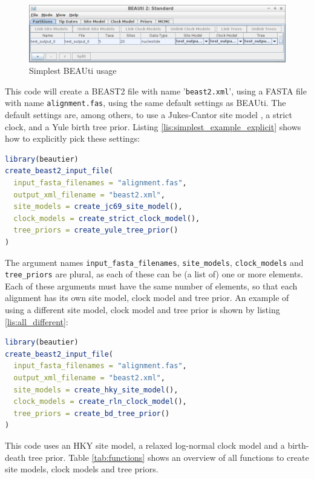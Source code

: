 \documentclass{article}
\begin{document}
\begin{figure}
  \centering
  \includegraphics[]{all_default.png}
  \caption{Simplest BEAUti usage}
  \label{fig:simplest_beauti_usage}
\end{figure}

This code will create a BEAST2 file with name '\verb;beast2.xml;',
using a FASTA file with name \verb;alignment.fas;, using the same default settings as BEAUti.
The default settings are, among others, to use a Jukes-Cantor site model \cite{cantor1969mammalian}, 
a strict clock, and a Yule birth tree prior. Listing \ref{lis:simplest_example_explicit} shows how
to explicitly pick these settings:

\begin{lstlisting}[language=R, caption=Simplest example with explicit defaults, label=lst:simplest_example_explicit, floatplacement=H]
library(beautier)
create_beast2_input_file(
  input_fasta_filenames = "alignment.fas",
  output_xml_filename = "beast2.xml",
  site_models = create_jc69_site_model(),
  clock_models = create_strict_clock_model(),
  tree_priors = create_yule_tree_prior()
)
\end{lstlisting}

The argument names \verb;input_fasta_filenames;, \verb;site_models;, \verb;clock_models; and \verb;tree_priors; are plural, as each of these
can be (a list of) one or more elements. Each of these arguments must have the same number of elements, so that each alignment has its
own site model, clock model and tree prior. An example of using a different site model, clock model and tree prior is shown by listing \ref{lis:all_different}:

\begin{lstlisting}[language=R, caption=Example with different site model and clock model and tree prior, label=lst:all_different, floatplacement=H]
library(beautier)
create_beast2_input_file(
  input_fasta_filenames = "alignment.fas",
  output_xml_filename = "beast2.xml",
  site_models = create_hky_site_model(),
  clock_models = create_rln_clock_model(),
  tree_priors = create_bd_tree_prior()
)
\end{lstlisting}

This code uses an HKY site model, a relaxed log-normal clock model and a birth-death tree prior.
Table \ref{tab:functions} shows an overview of all functions to create site models, clock models and tree priors.
\end{document}
